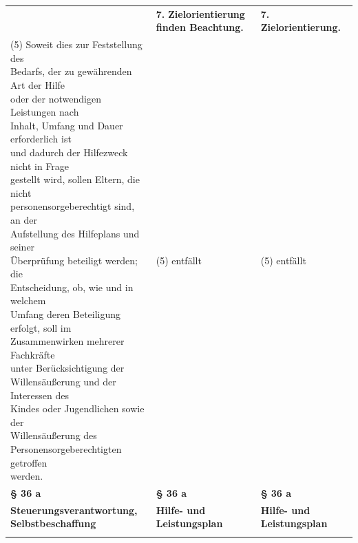 \documentclass[10pt,a4paper,landscape]{article}
\begin{document}
\begin{longtable}{|L{8.2cm}|L{8.2cm}|L{8.2cm}|}
\hhline{|---|}
 & \textbf{7.} \newline \textbf{\textcolor{diffred}{Zielorientierung finden Beachtung.}} & \textbf{7.} \newline \textbf{\textcolor{diffgreen}{Zielorientierung.}} \\
\hhline{|---|}
(5) \textcolor{diffred}{Soweit dies zur Feststellung des  \newline Bedarfs, der zu gewährenden Art der Hilfe  \newline oder der notwendigen Leistungen nach  \newline Inhalt, Umfang und Dauer erforderlich ist  \newline und dadurch der Hilfezweck nicht in Frage  \newline gestellt wird, sollen Eltern, die nicht  \newline personensorgeberechtigt sind, an der  \newline Aufstellung des Hilfeplans und seiner  \newline Überprüfung beteiligt werden; die  \newline Entscheidung, ob, wie und in welchem  \newline Umfang deren Beteiligung erfolgt, soll im  \newline Zusammenwirken mehrerer Fachkräfte  \newline unter Berücksichtigung der  \newline Willensäußerung und der Interessen des  \newline Kindes oder Jugendlichen sowie der  \newline Willensäußerung des  \newline Personensorgeberechtigten getroffen  \newline werden.} & (5) entfällt & (5) entfällt \\
\hhline{|---|}
\textbf{\S{} 36 a} & \textbf{\S{} 36 a} & \textbf{\S{} 36 a} \\
\hhline{|---|}
\textbf{\textcolor{diffred}{Steuerungsverantwortung,  \newline Selbstbeschaffung}} & \textbf{Hilfe- und Leistungsplan } & \textbf{Hilfe- und Leistungsplan } \\
\hhline{|---|}

\end{longtable}
\end{document}
